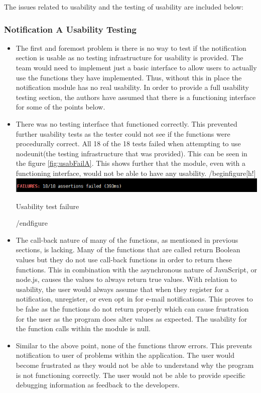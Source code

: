 The issues related to usability and the testing of usability are included below:
\subsubsection{Notification A Usability Testing}
\begin{itemize}
	\item The first and foremost problem is there is no way to test if the notification section is usable as no testing infrastructure for usability is provided. The team would need to implement just a basic interface to allow users to actually use the functions they have implemented. Thus, without this in place the notification module has no real usability. In order to provide a full usability testing section, the authors have assumed that there is a functioning interface for some of the points below.
	\item There was no testing interface that functioned correctly. This prevented further usability tests as the tester could not see if the functions were procedurally correct. All 18 of the 18 tests failed when attempting to use nodeunit(the testing infrastructure that was provided). This can be seen in the figure \ref{fig:usabFailA}. This shows further that the module, even with a functioning interface, would not be able to have any usability.
	/begin{figure}[h!]
		\includegraphics[width=\linewidth]{../images/Failure.png}
		\caption{Usability test failure}
		\label{fig:usabFailA}
	/end{figure}
	\item The call-back nature of many of the functions, as mentioned in previous sections, is lacking. Many of the functions that are called return Boolean values but they do not use call-back functions in order to return these functions. This in combination with the asynchronous nature of JavaScript, or node.js, causes the values to always return true values. With relation to usability, the user would always assume that when they register for a notification, unregister, or even opt in for e-mail notifications. This proves to be false as the functions do not return properly which can cause frustration for the user as the program does alter values as expected. The usability for the function calls within the module is null.
	\item Similar to the above point, none of the functions throw errors. This prevents notification to user of problems within the application. The user would become frustrated as they would not be able to understand why the program is not functioning correctly. The user would not be able to provide specific debugging information as feedback to the developers.

\end{itemize}
